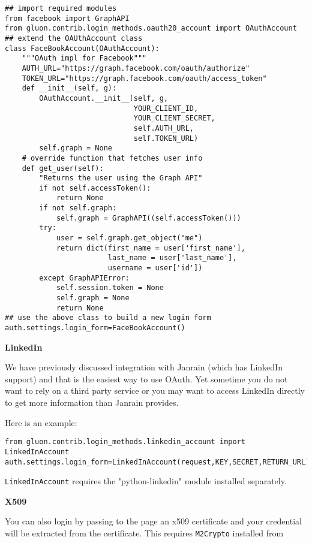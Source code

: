 \documentclass[justified,sixbynine,notoc]{tufte-book}
\def\ft{\small\tt}
\def\inxx#1{\index{#1}}
\begin{document}
\begin{fullwidth}
\begin{lstlisting}
## import required modules
from facebook import GraphAPI
from gluon.contrib.login_methods.oauth20_account import OAuthAccount
## extend the OAUthAccount class
class FaceBookAccount(OAuthAccount):
    """OAuth impl for Facebook"""
    AUTH_URL="https://graph.facebook.com/oauth/authorize"
    TOKEN_URL="https://graph.facebook.com/oauth/access_token"
    def __init__(self, g):
        OAuthAccount.__init__(self, g,
                              YOUR_CLIENT_ID,
                              YOUR_CLIENT_SECRET,
                              self.AUTH_URL,
                              self.TOKEN_URL)
        self.graph = None
    # override function that fetches user info
    def get_user(self):
        "Returns the user using the Graph API"
        if not self.accessToken():
            return None
        if not self.graph:
            self.graph = GraphAPI((self.accessToken()))
        try:
            user = self.graph.get_object("me")
            return dict(first_name = user['first_name'],
                        last_name = user['last_name'],
                        username = user['id'])
        except GraphAPIError:
            self.session.token = None
            self.graph = None
            return None
## use the above class to build a new login form
auth.settings.login_form=FaceBookAccount()
\end{lstlisting}

{\bf LinkedIn}

\inxx{LinkedIn}

We have previously discussed integration with Janrain (which has LinkedIn support) and that is the easiest way to use OAuth. Yet sometime you do not want to rely on a third party service or you may want to access LinkedIn directly to get more information than Janrain provides.

Here is an example:

\begin{lstlisting}
from gluon.contrib.login_methods.linkedin_account import LinkedInAccount
auth.settings.login_form=LinkedInAccount(request,KEY,SECRET,RETURN_URL)
\end{lstlisting}

{\ft LinkedInAccount} requires the "python-linkedin" module installed separately.

{\bf X509}

You can also login by passing to the page an x509 certificate and your credential will be extracted from the certificate. This requires {\ft M2Crypto} installed from


\end{fullwidth}
\end{document}

